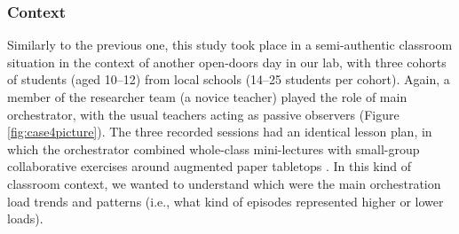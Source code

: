 \documentclass[10pt,journal,compsoc]{IEEEtran}
\begin{document}

\subsubsection{Context}

Similarly to the previous one, this study took place in a semi-authentic classroom situation in the context of another open-doors day in our lab, with three cohorts of students (aged 10--12) from local schools (14--25 students per cohort). Again, a member of the researcher team (a novice teacher) played the role of main orchestrator, with the usual teachers acting as passive observers (Figure \ref{fig:case4picture}). The three recorded sessions had an identical lesson plan, in which the orchestrator combined whole-class mini-lectures with small-group collaborative exercises around augmented paper tabletops \cite{caballero2014single}. In this kind of classroom context, we wanted to understand which were the main orchestration load trends and patterns (i.e., what kind of episodes represented higher or lower loads).

\end{document}
